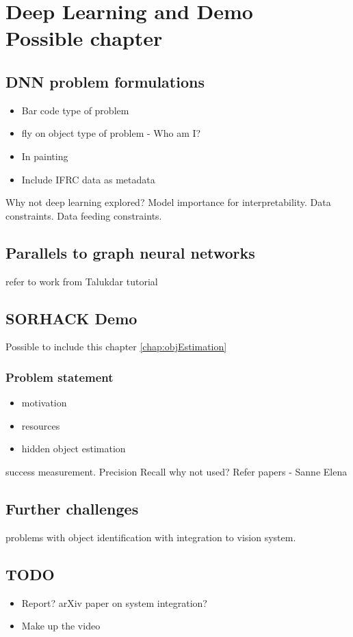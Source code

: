 \chapter{Deep Learning and Demo \\ {\Large Possible chapter}}
\label{chap:dnn}

\section{DNN problem formulations}
\begin{itemize}
\item Bar code type of problem
\item fly on object type of problem - Who am I?
\item In painting
\item Include IFRC data as metadata
\end{itemize}
Why not deep learning explored? Model importance for interpretability. Data constraints. Data feeding constraints.
\section{Parallels to graph neural networks}
refer to work from Talukdar tutorial
\section{SORHACK Demo}
Possible to include this chapter \ref{chap:objEstimation}
\subsection{Problem statement}
\begin{itemize}
\item motivation
\item resources
\item hidden object estimation
\end{itemize}
success measurement. Precision Recall why not used? Refer papers - Sanne Elena
\section{Further challenges}problems with object identification with integration to vision system.
\section{TODO}
\begin{itemize}
\item Report? arXiv paper on system integration?
\item Make up the video
\end{itemize} 
